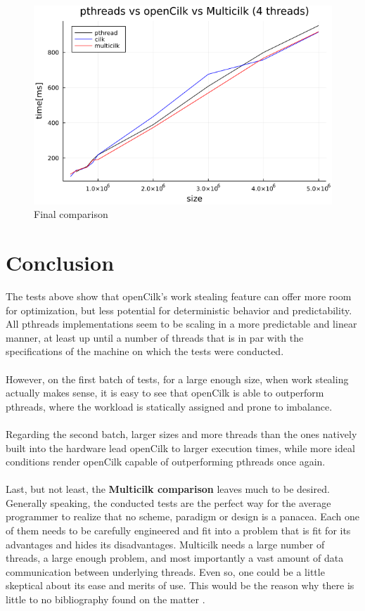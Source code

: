 \documentclass[11pt,a4paper,onecolumn,final]{article}
\newcommand{\gr}[1]{\foreignlanguage{greek}{#1}}
\newcommand{\en}[1]{\foreignlanguage{english}{#1}}
\begin{document}
\begin{figure}[p]
    \centering
    \includegraphics[scale=.5]{../data/image/benchmark/4-threads.png}
    \caption{Final comparison}
\end{figure}

\section{Conclusion}
The tests above show that openCilk's work stealing feature can offer more room for optimization, but less potential for deterministic behavior and predictability. All pthreads implementations seem to be scaling in a more predictable and linear manner, at least up until a number of threads that is in par with the specifications of the machine on which the tests were conducted.\\
\\
However, on the first batch of tests, for a large enough size, when work stealing actually makes sense, it is easy to see that openCilk is able to outperform pthreads, where the workload is statically assigned and prone to imbalance.\\
\\
Regarding the second batch, larger sizes and more threads than the ones natively built into the hardware lead openCilk to larger execution times, while more ideal conditions render openCilk capable of outperforming pthreads once again.\\
\\
Last, but not least, the \textbf{Multicilk comparison} leaves much to be desired. Generally speaking, the conducted tests are the perfect way for the average programmer to realize that no scheme, paradigm or design is a panacea. Each one of them needs to be carefully engineered and fit into a problem that is fit for its advantages and hides its disadvantages. Multicilk needs a large number of threads, a large enough problem, and most importantly a vast amount of data communication between underlying threads. Even so, one could be a little skeptical about its ease and merits of use. This would be the reason why there is little to no bibliography found on the matter \cite{pusapaty2022combining}.



\en{}
\end{document}
